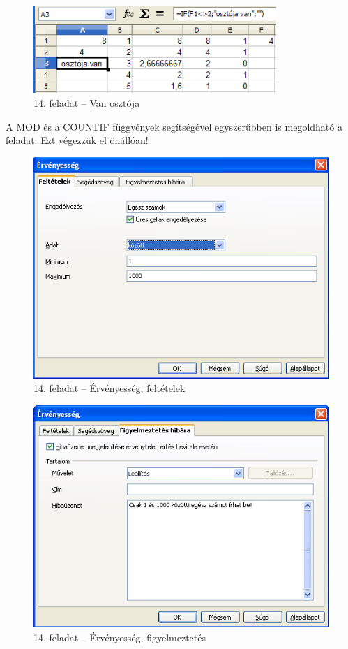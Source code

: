 \begin{figure}[!h]
\begin{center}
\includegraphics[width=9.211cm]{oocalcv1-img80.png}
\caption{14. feladat -- Van osztója}\label{14-feladatOsztó}
\end{center}
\end{figure}

A MOD és a COUNTIF függvények segítségével egyszerűbben
is megoldható a feladat. Ezt  végezzük el önállóan!

\begin{figure}[!h]
\begin{center}
\includegraphics[width=11.444cm]{oocalcv1-img81.png}
\caption{14. feladat -- Érvényesség, feltételek}\label{14-feladatFeltétel}
\end{center}
\end{figure}

\begin{figure}[!h ]
\begin{center}
\includegraphics[width=11.47cm]{oocalcv1-img82.png}
\caption{14. feladat -- Érvényesség, figyelmeztetés}\label{14-feladatFigy}
\end{center}
\end{figure}

